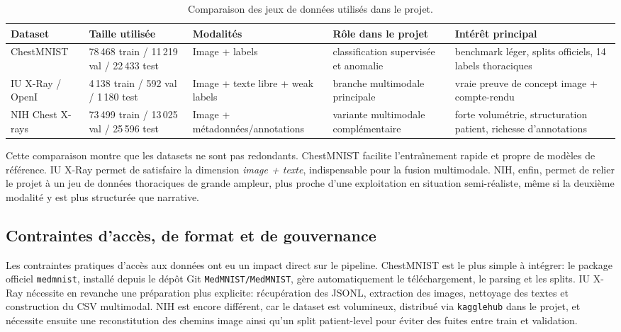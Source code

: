 \documentclass[11pt,a4paper]{article}
\begin{document}
\begin{table}[H]
    \centering
    \caption{Comparaison des jeux de donn\'ees utilis\'es dans le projet.}
    \label{tab:dataset-comparison}
    \small
    \begin{tabular}{p{3.1cm}p{2.0cm}p{2.2cm}p{2.3cm}p{3.4cm}}
        \toprule
        Dataset & Taille utilis\'ee & Modalit\'es & R\^ole dans le projet & Int\'er\^et principal \\
        \midrule
        ChestMNIST & 78\,468 train / 11\,219 val / 22\,433 test & Image + labels & classification supervis\'ee et anomalie & benchmark l\'eger, splits officiels, 14 labels thoraciques \\
        IU X-Ray / OpenI & 4\,138 train / 592 val / 1\,180 test & Image + texte libre + weak labels & branche multimodale principale & vraie preuve de concept image + compte-rendu \\
        NIH Chest X-rays & 73\,499 train / 13\,025 val / 25\,596 test & Image + m\'etadonn\'ees/annotations & variante multimodale compl\'ementaire & forte volum\'etrie, structuration patient, richesse d'annotations \\
        \bottomrule
    \end{tabular}
\end{table}

Cette comparaison montre que les datasets ne sont pas redondants. ChestMNIST facilite l'entra\^\i nement rapide et propre de mod\`eles de r\'ef\'erence. IU X-Ray permet de satisfaire la dimension \emph{image + texte}, indispensable pour la fusion multimodale. NIH, enfin, permet de relier le projet \`a un jeu de donn\'ees thoraciques de grande ampleur, plus proche d'une exploitation en situation semi-r\'ealiste, m\^eme si la deuxi\`eme modalit\'e y est plus structur\'ee que narrative.

\subsection{Contraintes d'acc\`es, de format et de gouvernance}
Les contraintes pratiques d'acc\`es aux donn\'ees ont eu un impact direct sur le pipeline. ChestMNIST est le plus simple \`a int\'egrer: le package officiel \texttt{medmnist}, install\'e depuis le d\'ep\^ot Git \texttt{MedMNIST/MedMNIST}, g\`ere automatiquement le t\'el\'echargement, le parsing et les splits. IU X-Ray n\'ecessite en revanche une pr\'eparation plus explicite: r\'ecup\'eration des JSONL, extraction des images, nettoyage des textes et construction du CSV multimodal. NIH est encore diff\'erent, car le dataset est volumineux, distribu\'e via \texttt{kagglehub} dans le projet, et n\'ecessite ensuite une reconstitution des chemins image ainsi qu'un split patient-level pour \'eviter des fuites entre train et validation.
\end{document}
